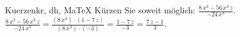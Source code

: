 \begin{MAufgabe}{Kuerzen}{kr, dh, MaTeX}
K\"urzen Sie soweit m\"oglich: $\frac{8\, x^3 - 56\, x^3\, z}{- 24\, x^3}$.\\ 
\ifLsg\MLoesung
\quad $\frac{8\, x^3 - 56\, x^3\, z}{- 24\, x^3}=\frac{(8\, x^3)\cdot(1 - 7\, z)}{(8\, x^3)\cdot(-3)}=\frac{1 - 7\, z}{-3}=\frac{7\, z - 1}{3}$.\else\relax\fi
 \end{MAufgabe}